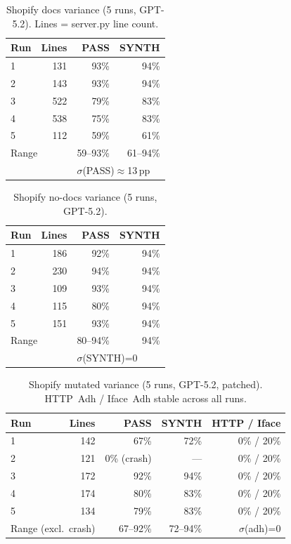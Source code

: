 \begin{table}[htbp]
  \centering
  \caption{Shopify docs variance (5 runs, GPT-5.2). Lines = server.py line count.}
  \label{tab:apx:var_shopify_d}
  \small
  \begin{tabular}{lrrr}
    \toprule
    Run & Lines & PASS & SYNTH \\
    \midrule
    1 & 131 & 93\% & 94\% \\
    2 & 143 & 93\% & 94\% \\
    3 & 522 & 79\% & 83\% \\
    4 & 538 & 75\% & 83\% \\
    5 & 112 & 59\% & 61\% \\
    \midrule
    \multicolumn{2}{l}{Range} & 59--93\% & 61--94\% \\
    \multicolumn{2}{l}{} & \multicolumn{2}{l}{$\sigma$(PASS)$\approx$13\,pp} \\
    \bottomrule
  \end{tabular}
\end{table}

\begin{table}[htbp]
  \centering
  \caption{Shopify no-docs variance (5 runs, GPT-5.2).}
  \label{tab:apx:var_shopify_nd}
  \small
  \begin{tabular}{lrrr}
    \toprule
    Run & Lines & PASS & SYNTH \\
    \midrule
    1 & 186 & 92\% & 94\% \\
    2 & 230 & 94\% & 94\% \\
    3 & 109 & 93\% & 94\% \\
    4 & 115 & 80\% & 94\% \\
    5 & 151 & 93\% & 94\% \\
    \midrule
    \multicolumn{2}{l}{Range} & 80--94\% & 94\% \\
    \multicolumn{2}{l}{} & \multicolumn{2}{l}{$\sigma$(SYNTH)=0} \\
    \bottomrule
  \end{tabular}
\end{table}

\begin{table}[htbp]
  \centering
  \caption{Shopify mutated variance (5 runs, GPT-5.2, patched). HTTP~Adh / Iface~Adh stable across all runs.}
  \label{tab:apx:var_shopify_m}
  \small
  \begin{tabular}{lrrrr}
    \toprule
    Run & Lines & PASS & SYNTH & HTTP / Iface \\
    \midrule
    1 & 142 & 67\% & 72\% & 0\% / 20\% \\
    2 & 121 & 0\% (crash) & --- & 0\% / 20\% \\
    3 & 172 & 92\% & 94\% & 0\% / 20\% \\
    4 & 174 & 80\% & 83\% & 0\% / 20\% \\
    5 & 134 & 79\% & 83\% & 0\% / 20\% \\
    \midrule
    \multicolumn{2}{l}{Range (excl.\ crash)} & 67--92\% & 72--94\% & $\sigma$(adh)=0 \\
    \bottomrule
  \end{tabular}
\end{table}

